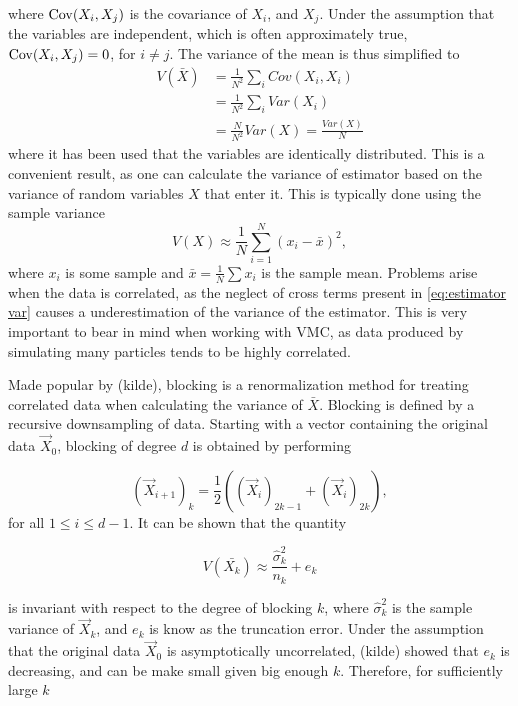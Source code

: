 where $\mathrm{Cov}(X_i, X_j)$ is the covariance of $X_i$, and $X_j$. Under the
assumption that the variables are independent, which is often approximately
true, $\mathrm{Cov}(X_i, X_j) = 0$, for $i \neq j$. The variance of the mean is thus simplified to 
\begin{align*}
  V(\bar{X}) &= \frac{1}{N^2}\sum_{i}{Cov(X_i, X_i)} \\
  &= \frac{1}{N^2}\sum_{i}{Var(X_i)} \\
	&=\frac{N}{N^2}Var(X) = \frac{Var(X)}{N}
\end{align*}
where it has been used that the variables are identically distributed.
This is a convenient result, as one can calculate the variance of estimator
based on the variance of random variables $X$ that enter it. This is typically done using the sample variance
\begin{equation*}
	V(X) \approx \frac{1}{N}\sum_{i=1}^{N}{(x_i - \bar{x})^2},
\end{equation*}
where $x_i$ is some sample and $\bar{x} = \frac{1}{N}\sum{x_i}$ is the sample mean.
Problems arise when the data is correlated, as the neglect of cross terms
present in \autoref{eq:estimator var} causes a underestimation of the variance
of the estimator. This is very important to bear in mind when working with VMC,
as data produced by simulating many particles tends to be highly correlated. 


Made popular by (kilde), blocking is a renormalization method for treating correlated data when calculating the variance of $\bar{X}$. Blocking is defined by a recursive downsampling of data. Starting with a vector containing the original data $\vec{X}_0$, blocking of degree $d$ is obtained by performing

\begin{equation*}
	\left(\vec{X}_{i+1}\right)_k = \frac{1}{2}\left(\left(\vec{X}_{i}\right)_{2k -1} + \left(\vec{X}_{i}\right)_{2k}\right),
\end{equation*}
for all $1 \leq i \leq d-1$. 
\newline
It can be shown that the quantity 

\begin{equation*}
	V(\bar{X_k}) \approx \frac{\hat{\sigma}_k^2}{n_k} +  e_k
\end{equation*}

is invariant with respect to the degree of blocking $k$, where $\hat{\sigma}_k^2$ is the sample variance of $\vec{X}_k$, and $e_k$ is know as the truncation error. Under the assumption that the original data $\vec{X}_0$ is asymptotically uncorrelated, (kilde) showed that $e_k$ is decreasing, and can be make small given big enough $k$. Therefore, for sufficiently large $k$

